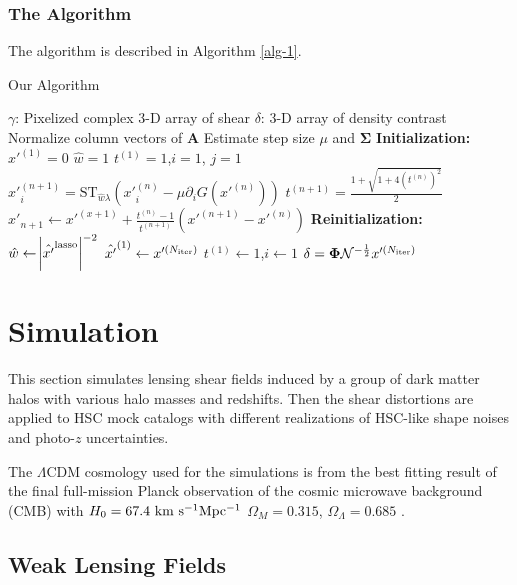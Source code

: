 \documentclass[twocolumn]{aastex62}
\begin{document}
\subsubsection{The Algorithm}
The algorithm is described in Algorithm \ref{alg-1}.

\begin{algorithm}[H]
\renewcommand{\thealgorithm}{}
\label{alg-1}
\caption{Our Algorithm}
\begin{algorithmic}[1]
\INPUT $\gamma$: Pixelized complex $3$-D array of shear
\OUTPUT  $\delta$: $3$-D array of density contrast
\STATE Normalize column vectors of $\mathbf{A}$
\STATE Estimate step size $\mu$ and $\mathbf{\Sigma}$
\STATE \textbf{Initialization:} ‎
\STATE $x'^{(1)} = 0$ 
\STATE $\hat{w}=1$
\STATE $t^{(1)}=1$,$i=1$, $j=1$
        \STATE $x'^{(n+1)}_{i}=\mathrm{ST}_{\hat{w}\lambda} \left(x'^{(n)}_{i} -\mu \partial_i G(x'^{(n)})\right)$
        \STATE $t^{(n+1)}=\frac{1+\sqrt{1+4(t^{(n)})^2}}{2}$
        \STATE $x'_{n+1} \leftarrow x'^{(x+1)}+ \frac{t^{(n)}-1}{t^{(n+1)}}(x'^{(n+1)}-x'^{(n)})$
    \ENDWHILE
\STATE \textbf{Reinitialization:} ‎
\STATE $\hat{w}\leftarrow \abs{\hat{x'}^{\rm{lasso}}}^{-2}$
\STATE $\hat{x'}^{(1)} \leftarrow x'^{(N_{\rm{iter}})}$
\STATE $t^{(1)}\leftarrow1$,$i\leftarrow1$
\ENDWHILE
\STATE $\delta=\mathbf{\Phi}\mathcal{N}^{-\frac{1}{2}}x'^{(N_{\rm{iter}})}$
\end{algorithmic}
\end{algorithm}


\section{Simulation}
\label{sec:Sim}

This section simulates lensing shear fields induced by a group of dark matter halos with various halo masses and redshifts.
Then the shear distortions are applied to HSC mock catalogs with different realizations of HSC-like shape noises and photo-$z$
uncertainties.

The $\Lambda$CDM cosmology used for the simulations is from the best fitting result of the final full-mission Planck observation 
of the cosmic microwave background (CMB) with $H_0=67.4 ~\rm{km~s^{-1} Mpc^{-1}}$ $\Omega_M=0.315$, $\Omega_\Lambda=0.685$
\citep{cmb-Planck2018-Cosmology}.

\subsection{Weak Lensing Fields}
\end{document}
